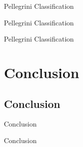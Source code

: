 \documentclass[  compress,xcolor={usenames,dvipsnames}]{beamer}
\begin{document}
\begin{frame}{Pellegrini Classification}
\begin{figure}
  \centering
  \resizebox{0.65\textwidth}{!}{}
\end{figure}
\end{frame}

\begin{frame}{Pellegrini Classification}
\begin{figure}
  \centering
  \resizebox{0.65\textwidth}{!}{}
\end{figure}
\end{frame}

\begin{frame}{Pellegrini Classification}
\begin{figure}
  \centering
  \resizebox{0.65\textwidth}{!}{}
\end{figure}
\end{frame}


\section{Conclusion}

\subsection{Conclusion}
\begin{frame}{Conclusion}
\begin{figure}
  \centering
  \resizebox{0.65\textwidth}{!}{}
\end{figure}
\end{frame}

\begin{frame}{Conclusion}
\begin{figure}
  \centering
  \resizebox{0.65\textwidth}{!}{}
\end{figure}
\end{frame}
\end{document}
